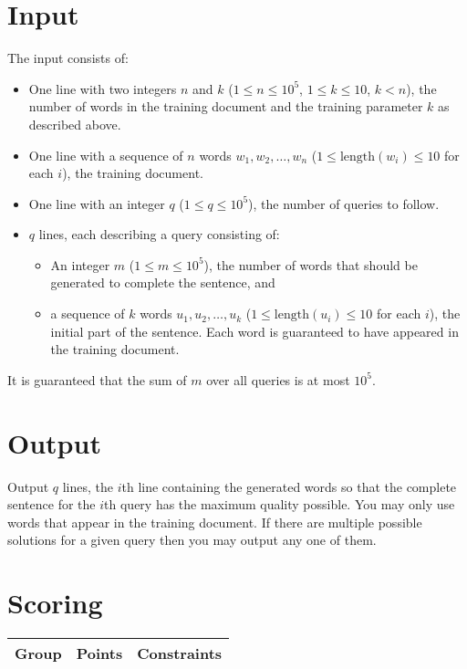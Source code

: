 \section*{Input}
The input consists of:
\begin{itemize}
  \item One line with two integers $n$ and $k$ ($1 \leq n \leq 10^5$, $1 \leq k
       \leq 10$, $k < n$), the number of words in the training document and the training
        parameter $k$ as described above.
  \item One line with a sequence of $n$ words $w_1, w_2, \ldots, w_n$ ($1 \leq
        \mathrm{length}(w_i) \leq 10$ for each $i$), the training document.
  \item One line with an integer $q$ ($1 \leq q \leq 10^5$), the number of queries to follow.
  \item $q$ lines, each describing a query consisting of:
    \begin{itemize}
      \item An integer $m$ ($1 \leq m \leq 10^5$), the number of words that
            should be generated to complete the sentence, and
      \item a sequence of $k$ words $u_1, u_2, \ldots, u_k$ ($1 \leq
            \mathrm{length}(u_i) \leq 10$ for each $i$), the initial part of
            the sentence. Each word is guaranteed to have appeared in the
            training document.
    \end{itemize}
\end{itemize}

It is guaranteed that the sum of $m$ over all queries is at most $10^5$.

\section*{Output}
Output $q$ lines, the $i$th line containing the generated words so that the
complete sentence for the $i$th query has the maximum quality possible. You may
only use words that appear in the training document. If there are multiple
possible solutions for a given query then you may output any one of them.

\section*{Scoring}
\begin{tabular}{|l|l|l|}
    \hline
    Group & Points & Constraints \\ \hline
\end{tabular}

